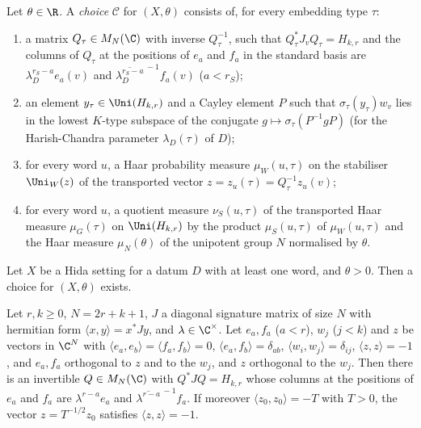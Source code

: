 \begin{definition}\label{pf:sh-siegel:choice}
Let $\theta\in\R$. A \emph{choice} $\mathcal C$ for $(X,\theta)$ consists of, for every embedding type $\tau$:
\begin{enumerate}[label=(C\arabic*)]
\item\label{pf:sh-siegel:C1} a matrix $Q_\tau\in M_N(\C)$ with inverse $Q_\tau^{-1}$, such that $Q_\tau^*J_vQ_\tau=H_{k,r}$ and the
columns of $Q_\tau$ at the positions of $e_a$ and $f_a$ in the standard basis are $\lambda_D^{r_S-a}e_a(v)$ and
$\overline{\lambda_D^{r_S-a}}^{\,-1}f_a(v)$ ($a<r_S$);
\item\label{pf:sh-siegel:C2} an element $y_\tau\in\Uni(H_{k,r})$ and a Cayley element $P$ such that $\sigma_\tau(y_\tau)w_v$
lies in the lowest $K$-type subspace of the conjugate $g\mapsto\sigma_\tau(P^{-1}gP)$ (for the Harish-Chandra parameter
$\lambda_D(\tau)$ of $D$);
\item\label{pf:sh-siegel:C3} for every word $u$, a Haar probability measure $\mu_W(u,\tau)$ on the stabiliser $\Uni_W(z)$ of the
transported vector $z=z_u(\tau)=Q_\tau^{-1}z_u(v)$;
\item\label{pf:sh-siegel:C4} for every word $u$, a quotient measure $\nu_S(u,\tau)$ of the transported Haar measure
$\mu_G(\tau)$ on $\Uni(H_{k,r})$ by the product $\mu_S(u,\tau)$ of $\mu_W(u,\tau)$ and the Haar measure $\mu_N(\theta)$ of the
unipotent group $N$ normalised by $\theta$.
\end{enumerate}
\end{definition}

\begin{proposition}\label{pf:sh-siegel:choiceexists}
Let $X$ be a Hida setting for a datum $D$ with at least one word, and $\theta>0$. Then a choice for $(X,\theta)$ exists.
\end{proposition}

\begin{lemma}\label{pf:sh-siegel:transp}
Let $r,k\ge0$, $N=2r+k+1$, $J$ a diagonal signature matrix of size $N$ with hermitian form $\langle x,y\rangle=x^*Jy$, and
$\lambda\in\C^\times$. Let $e_a,f_a$ ($a<r$), $w_j$ ($j<k$) and $z$ be vectors in $\C^N$ with $\langle e_a,e_b\rangle=
\langle f_a,f_b\rangle=0$, $\langle e_a,f_b\rangle=\delta_{ab}$, $\langle w_i,w_j\rangle=\delta_{ij}$, $\langle z,z\rangle=-1$,
and $e_a,f_a$ orthogonal to $z$ and to the $w_j$, and $z$ orthogonal to the $w_j$. Then there is an invertible $Q\in
M_N(\C)$ with $Q^*JQ=H_{k,r}$ whose columns at the positions of $e_a$ and $f_a$ are $\lambda^{r-a}e_a$ and
$\overline{\lambda^{r-a}}^{\,-1}f_a$. If moreover $\langle z_0,z_0\rangle=-T$ with $T>0$, the vector $z=T^{-1/2}z_0$
satisfies $\langle z,z\rangle=-1$.
\end{lemma}


